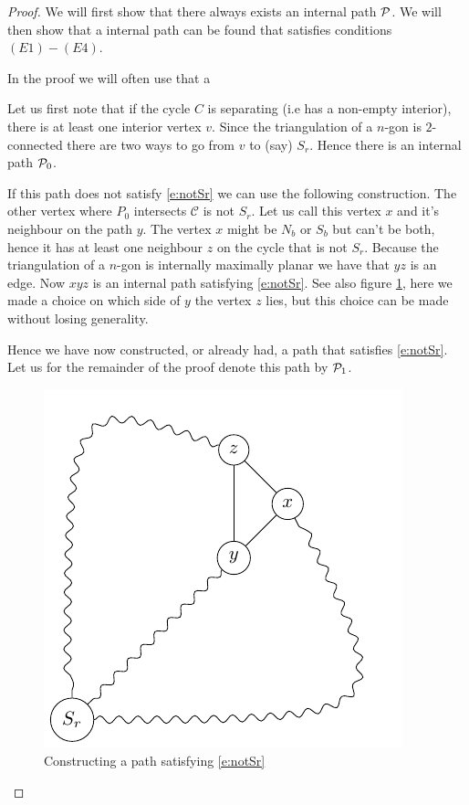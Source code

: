\documentclass[a4paper]{article}
\theoremstyle{definition}
\newcommand{\scr}[1]{\mathcal{#1}}
\newcommand{\C}{\scr C}
\begin{document}
\begin{proof}
We will first show that there always exists an internal path $\P$. We will then show that a internal path can be found that satisfies conditions $(E1) - (E4)$.

In the proof we will often use that a 

Let us first note that if the cycle $C$ is separating (i.e has a non-empty interior), there is at least one interior vertex $v$. Since the triangulation of a $n$-gon is $2$-connected there are two ways to go from $v$ to (say) $S_r$. Hence there is an internal path $\P_0$.

If this path does not satisfy \ref{e:notSr} we can use the following construction. The other vertex where $P_0$ intersects $\C$ is not $S_r$. Let us call this vertex $x$ and it's neighbour on the path $y$. The vertex $x$ might be $N_b$ or $S_b$ but can't be both, hence it has at least one neighbour $z$ on the cycle that is not $S_r$. Because the triangulation of a $n$-gon is internally maximally planar we have that $yz$ is an edge. Now $xyz$ is an internal path satisfying \ref{e:notSr}. See also figure \ref{fig:E1}, here we made a choice on which side of $y$ the vertex $z$ lies, but this choice can be made without losing generality.

Hence we have now constructed, or already had, a path that satisfies \ref{e:notSr}. Let us for the remainder of the proof denote this path by $\P_1$.


\begin{figure}[h!]
\centering
\includegraphics[]{img/algo/E1}
\caption{Constructing a path satisfying \ref{e:notSr} \label{fig:E1}}
\end{figure}


\end{proof}
\end{document}
